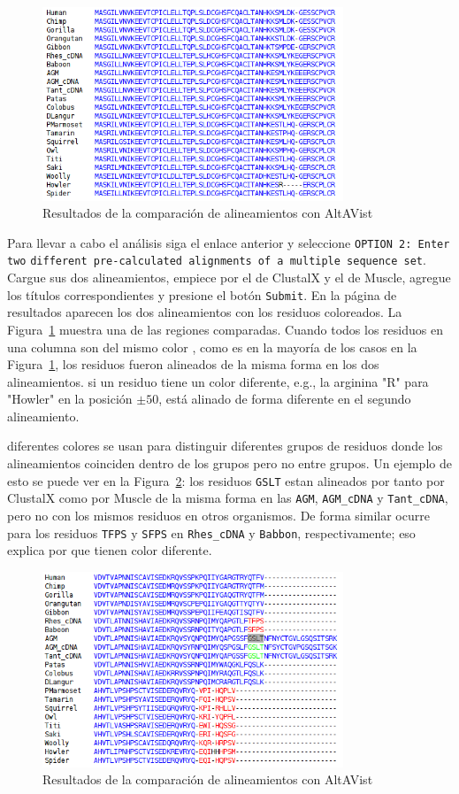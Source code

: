 \documentclass[letter,11pt]{book}
\begin{document}
\begin{figure}[h!]
\centering
 \includegraphics[width=9cm]{Figs/AltAVist1.png}
 \caption{\label{fig:AltAVist}Resultados de la comparación de alineamientos con {\sc AltAVist}}
\end{figure}

Para llevar a cabo el análisis siga el enlace anterior y seleccione \Verb+OPTION 2: Enter two+ \Verb+different pre-calculated alignments of a multiple sequence set+. Cargue sus dos alineamientos, empiece por el de {\sc ClustalX} y el de {\sc Muscle}, agregue los títulos correspondientes y presione el botón \Verb+Submit+. En la página de resultados aparecen los dos alineamientos con los residuos coloreados. La Figura~\ref{fig:AltAVist} muestra una de las regiones comparadas. Cuando todos los residuos en una columna son del mismo color , como es en la mayoría de los casos en la Figura~\ref{fig:AltAVist}, los residuos fueron alineados de la misma forma en los dos alineamientos. si un residuo tiene un color diferente, e.g., la arginina "R" para "Howler" en la posición $\pm 50$, está alinado de forma diferente en el segundo alineamiento.

diferentes colores se usan para distinguir diferentes grupos de residuos donde los alineamientos coinciden dentro de los grupos pero no entre grupos. Un ejemplo de esto se puede ver en la Figura~\ref{fig:AltAVist2}: los residuos \Verb+GSLT+ estan alineados por tanto por {\sc ClustalX} como por {\sc Muscle} de la misma forma en las \Verb+AGM+, \Verb+AGM_cDNA+ y \Verb+Tant_cDNA+, pero no con los mismos residuos en otros organismos. De forma similar ocurre para los residuos \Verb+TFPS+ y \Verb+SFPS+ en \Verb+Rhes_cDNA+ y \Verb+Babbon+, respectivamente; eso explica por que tienen color diferente.

\begin{figure}[h!]
\centering
 \includegraphics[width=9cm]{Figs/AltAVist2.png}
 \caption{\label{fig:AltAVist2}Resultados de la comparación de alineamientos con {\sc AltAVist}}
\end{figure}
\end{document}
